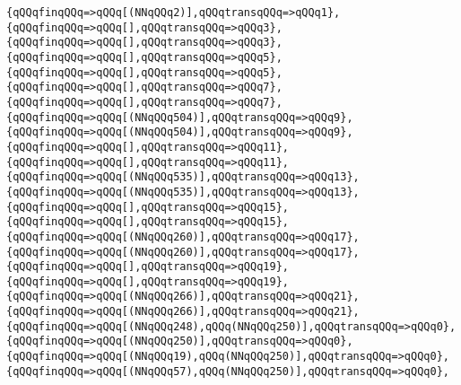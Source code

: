 \verb|{qQQqfinqQQq=>qQQq[(NNqQQq2)],qQQqtransqQQq=>qQQq1},|\newline
\verb|{qQQqfinqQQq=>qQQq[],qQQqtransqQQq=>qQQq3},|\newline
\verb|{qQQqfinqQQq=>qQQq[],qQQqtransqQQq=>qQQq3},|\newline
\verb|{qQQqfinqQQq=>qQQq[],qQQqtransqQQq=>qQQq5},|\newline
\verb|{qQQqfinqQQq=>qQQq[],qQQqtransqQQq=>qQQq5},|\newline
\verb|{qQQqfinqQQq=>qQQq[],qQQqtransqQQq=>qQQq7},|\newline
\verb|{qQQqfinqQQq=>qQQq[],qQQqtransqQQq=>qQQq7},|\newline
\verb|{qQQqfinqQQq=>qQQq[(NNqQQq504)],qQQqtransqQQq=>qQQq9},|\newline
\verb|{qQQqfinqQQq=>qQQq[(NNqQQq504)],qQQqtransqQQq=>qQQq9},|\newline
\verb|{qQQqfinqQQq=>qQQq[],qQQqtransqQQq=>qQQq11},|\newline
\verb|{qQQqfinqQQq=>qQQq[],qQQqtransqQQq=>qQQq11},|\newline
\verb|{qQQqfinqQQq=>qQQq[(NNqQQq535)],qQQqtransqQQq=>qQQq13},|\newline
\verb|{qQQqfinqQQq=>qQQq[(NNqQQq535)],qQQqtransqQQq=>qQQq13},|\newline
\verb|{qQQqfinqQQq=>qQQq[],qQQqtransqQQq=>qQQq15},|\newline
\verb|{qQQqfinqQQq=>qQQq[],qQQqtransqQQq=>qQQq15},|\newline
\verb|{qQQqfinqQQq=>qQQq[(NNqQQq260)],qQQqtransqQQq=>qQQq17},|\newline
\verb|{qQQqfinqQQq=>qQQq[(NNqQQq260)],qQQqtransqQQq=>qQQq17},|\newline
\verb|{qQQqfinqQQq=>qQQq[],qQQqtransqQQq=>qQQq19},|\newline
\verb|{qQQqfinqQQq=>qQQq[],qQQqtransqQQq=>qQQq19},|\newline
\verb|{qQQqfinqQQq=>qQQq[(NNqQQq266)],qQQqtransqQQq=>qQQq21},|\newline
\verb|{qQQqfinqQQq=>qQQq[(NNqQQq266)],qQQqtransqQQq=>qQQq21},|\newline
\verb|{qQQqfinqQQq=>qQQq[(NNqQQq248),qQQq(NNqQQq250)],qQQqtransqQQq=>qQQq0},|\newline
\verb|{qQQqfinqQQq=>qQQq[(NNqQQq250)],qQQqtransqQQq=>qQQq0},|\newline
\verb|{qQQqfinqQQq=>qQQq[(NNqQQq19),qQQq(NNqQQq250)],qQQqtransqQQq=>qQQq0},|\newline
\verb|{qQQqfinqQQq=>qQQq[(NNqQQq57),qQQq(NNqQQq250)],qQQqtransqQQq=>qQQq0},|\newline
